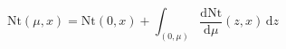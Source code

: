 \documentclass[preview]{standalone}
\begin{document}
\begin{equation}
\tag{33}
    \mathrm{Nt} ( \mu , x ) = \mathrm{Nt} ( 0 , x ) + \int_{( 0 , \mu )} \frac{\mathrm{d}\mathrm{Nt}}{\mathrm{d}\mu} ( z , x ) \, \mathrm{d}z
\end{equation}
\end{document}
